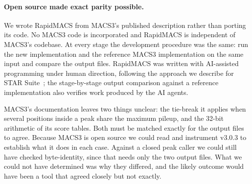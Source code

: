\documentclass[namedate,webpdf,contemporary,large]{oup-authoring-template}
\begin{document}
\paragraph{Open source made exact parity possible.}
We wrote RapidMACS from MACS3's published description rather than porting its code. No MACS3 code is incorporated and RapidMACS is independent of MACS3's codebase. At every stage the development procedure was the same: run the new implementation and the reference MACS3 implementation on the same input and compare the output files. RapidMACS was written with AI-assisted programming under human direction, following the approach we describe for STAR Suite~\citep{starsuite}; the stage-by-stage output comparison against a reference implementation also verifies work produced by the AI agents.

MACS3's documentation leaves two things unclear: the tie-break it applies when several positions inside a peak share the maximum pileup, and the 32-bit arithmetic of its score tables. Both must be matched exactly for the output files to agree. Because MACS3 is open source we could read and instrument v3.0.3 to establish what it does in each case. Against a closed peak caller we could still have checked byte-identity, since that needs only the two output files. What we could not have determined was why they differed, and the likely outcome would have been a tool that agreed closely but not exactly.

\end{document}
